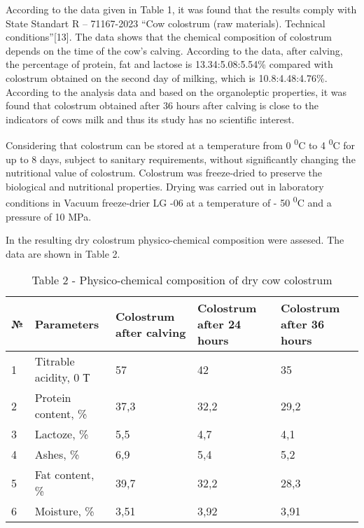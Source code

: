 \begin{multicols}{2}
According to the data given in Table 1, it was found that the results
comply with State Standart R -- 71167-2023 ``Cow colostrum (raw
materials). Technical conditions''{[}13{]}. The data shows that the
chemical composition of colostrum depends on the time of the cow's
calving. According to the data, after calving, the percentage of
protein, fat and lactose is 13.34:5.08:5.54\% compared with colostrum
obtained on the second day of milking, which is 10.8:4.48:4.76\%.
According to the analysis data and based on the organoleptic properties,
it was found that colostrum obtained after 36 hours after calving is
close to the indicators of cow\textquotesingle s milk and thus its study
has no scientific interest.

Considering that colostrum can be stored at a temperature from 0
\textsuperscript{0}C to 4 \textsuperscript{0}C for up to 8 days, subject
to sanitary requirements, without significantly changing the nutritional
value of colostrum. Colostrum was freeze-dried to preserve the
biological and nutritional properties. Drying was carried out in
laboratory conditions in Vacuum freeze-drier LG -06 at a temperature of
- 50 \textsuperscript{0}C and a pressure of 10 MPa.

In the resulting dry colostrum physico-chemical composition were
assesed. The data are shown in Table 2.
\end{multicols}

\begin{table}[H]
\caption*{Table 2 - Physico-chemical composition of dry cow colostrum}
\centering
\begin{tabular}{|l|l|l|l|l|}
\hline
№ & Parameters & Colostrum after calving & Colostrum after 24 hours & Colostrum after 36 hours \\ \hline
1 & Titrable acidity, 0 Т & 57 & 42 & 35 \\ \hline
2 & Protein content, \% & 37,3 & 32,2 & 29,2 \\ \hline
3 & Lactoze, \% & 5,5 & 4,7 & 4,1 \\ \hline
4 & Ashes, \% & 6,9 & 5,4 & 5,2 \\ \hline
5 & Fat content, \% & 39,7 & 32,2 & 28,3 \\ \hline
6 & Moisture, \% & 3,51 & 3,92 & 3,91 \\ \hline
\end{tabular}
\end{table}

